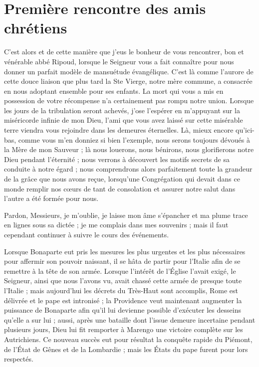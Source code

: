 \section*{Première rencontre des amis chrétiens}
C'est alors et de cette manière que j'eus le bonheur de vous rencontrer, bon et vénérable abbé Ripoud, lorsque le Seigneur vous a fait connaître pour nous donner un parfait modèle de mansuétude évangélique. C'est là comme l'aurore de cette douce liaison que plus tard la Ste Vierge, notre mère commune, a consacrée en nous adoptant ensemble pour ses enfants. La mort qui vous a mis en possession de votre récompense n'a certainement pas rompu notre union. Lorsque les jours de la tribulation seront achevés, j'ose l'espérer en m'appuyant sur la miséricorde infinie de mon Dieu, l'ami que vous avez laissé sur cette misérable terre viendra vous rejoindre dans les demeures éternelles. Là, mieux encore qu'ici-bas, comme vous m'en donniez si bien l'exemple, nous serons toujours dévoués à la Mère de mon Sauveur ; là nous louerons, nous bénirons, nous glorifierons notre Dieu pendant l'éternité ; nous verrons à découvert les motifs secrets de sa conduite à notre égard ; nous comprendrons
alors parfaitement toute la grandeur de la grâce que nous avons reçue, lorsqu'une Congrégation qui devait dans ce monde remplir nos cœurs de tant de consolation et assurer notre salut dans l'autre a été formée pour nous.

Pardon, Messieurs, je m'oublie, je laisse mon âme s'épancher et ma plume trace en lignes sous sa dictée ; je me complais dans mes souvenirs ; mais il faut cependant continuer à suivre le cours des événements.

Lorsque Bonaparte eut pris les mesures les plus urgentes et les plus nécessaires pour affermir son pouvoir naissant, il se hâta de partir pour l'Italie afin de se remettre à la tête de son armée. Lorsque l'intérêt de l'Église l'avait exigé, le Seigneur, ainsi que nous l'avons vu, avait chassé cette armée de presque toute l'Italie ; mais aujourd'hui les décrets du Très-Haut sont accomplis, Rome est délivrée et le pape est intronisé ; la Providence veut maintenant augmenter la puissance de Bonaparte afin qu'il lui devienne possible d'exécuter les desseins qu'elle a sur lui ; aussi, après une bataille dont l'issue demeure incertaine pendant plusieurs jours, Dieu lui fit remporter à Marengo une victoire complète sur les Autrichiens. Ce nouveau succès eut pour résultat la conquête rapide du Piémont, de l'État de Gênes et de la Lombardie ; mais les États du pape furent pour lors respectés.

